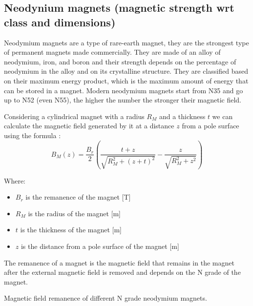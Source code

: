 \subsection{Neodynium magnets (magnetic strength wrt class and dimensions)}
Neodymium magnets are a type of rare-earth magnet, they are the strongest type of permanent magnets made commercially.
They are made of an alloy of neodymium, iron, and boron and their strength depends on the percentage of neodymium in the alloy and on its crystalline structure.
They are classified based on their maximum energy product, which is the maximum amount of energy that can be stored in a magnet. Modern neodymium magnets start from N35 and go up to N52 (even N55), the higher the number the stronger their magnetic field.

Considering a cylindrical magnet with a radius $R_M$ and a thickness $t$ we can calculate the magnetic field generated by it at a distance $z$ from a pole surface using the formula \cite{Magnetic_field_perm_magnet}:
\begin{equation}
    B_M(z) = \frac{B_r}{2} \left( \frac{t+z}{\sqrt{R_M^2+(z+t)^2}} - \frac{z}{\sqrt{R_M^2+z^2}} \right) \label{eq: Magnetic_field_perm_magnet}
\end{equation} 

Where: 
\begin{itemize}
    \item $B_r$ is the remanence of the magnet [T]
    \item $R_M$ is the radius of the magnet [m]
    \item $t$ is the thickness of the magnet [m]
    \item $z$ is the distance from a pole surface of the magnet [m]
\end{itemize}

The remanence of a magnet is the magnetic field that remains in the magnet after the external magnetic field is removed and depends on the N grade of the magnet.

\begin{table}
    \centering
    \resizebox{.6\linewidth}{!}{}
    \caption{Magnetic field remanence of different N grade neodymium magnets.}
    \label{tab: magnet_grades}
\end{table}